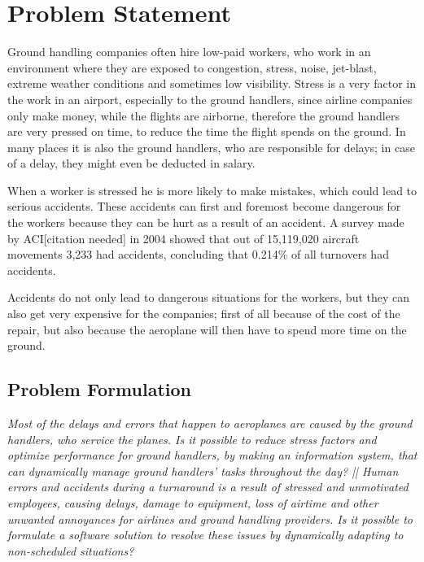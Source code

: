\chapter{Problem Statement}

Ground handling companies often hire low-paid workers, who work in an environment where they are exposed to congestion, stress, noise, jet-blast, extreme weather conditions and sometimes low visibility. Stress is a very factor in the work in an airport, especially to the ground handlers, since airline companies only make money, while the flights are airborne, therefore the ground handlers are very pressed on time, to reduce the time the flight spends on the ground. In many places it is also the ground handlers, who are responsible for delays; in case of a delay, they might even be deducted in salary.

When a worker is stressed he is more likely to make mistakes, which could lead to serious accidents. These accidents can first and foremost become dangerous for the workers because they can be hurt as a result of an accident. A survey made by ACI[citation needed] in 2004 showed that out of 15,119,020 aircraft movements 3,233 had accidents, concluding that 0.214\% of all turnovers had accidents.

Accidents do not only lead to dangerous situations for the workers, but they can also get very expensive for the companies; first of all because of the cost of the repair, but also because the aeroplane will then have to spend more time on the ground.
\section{Problem Formulation}
\begin{center}
\textit{Most of the delays and errors that happen to aeroplanes are caused by the ground handlers, who service the planes. Is it possible to reduce stress factors and optimize performance for ground handlers, by making an information system, that can dynamically manage ground handlers' tasks throughout the day? || Human errors and accidents during a turnaround is a result of stressed and unmotivated employees, causing delays, damage to equipment, loss of airtime and other unwanted annoyances for airlines and ground handling providers. Is it possible to formulate a software solution to resolve these issues by dynamically adapting to non-scheduled situations?}
\end{center}
